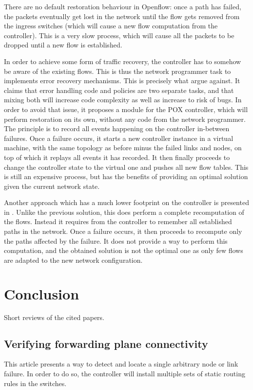 \documentclass[compsoc]{IEEEtran}
\begin{document}
There are no default restoration behaviour in Openflow: once a path has failed, the packets eventually get lost in the network until the flow gets removed from the ingress switches (which will cause a new flow computation from the controller). This is a very slow process, which will cause all the packets to be dropped until a new flow is established.

In order to achieve some form of traffic recovery, the controller has to somehow be aware of the existing flows. This is thus the network programmer task to implements error recovery mechanisms. This is precisely what \cite{Kuzniar:2013:AFR:2491185.2491218} argue against. It claims that error handling code and policies are two separate tasks, and that mixing both will increase code complexity as well as increase to risk of bugs. In order to avoid that issue, it proposes a module for the POX controller, which will perform restoration on its own, without any code from the network programmer. The principle is to record all events happening on the controller in-between failures. Once a failure occurs, it starts a new controller instance in a virtual machine, with the same topology as before minus the failed links and nodes, on top of which it replays all events it has recorded. It then finally proceeds to change the controller state to the virtual one and pushes all new flow tables. This is still an expensive process, but has the benefits of providing an optimal solution given the current network state.

Another approach which has a much lower footprint on the controller is presented in \cite{2911632}. Unlike the previous solution, this does perform a complete recomputation of the flows. Instead it requires from the controller to remember all established paths in the network. Once a failure occurs, it then proceeds to recompute only the paths affected by the failure. It does not provide a way to perform this computation, and the obtained solution is not the optimal one as only few flows are adapted to the new network configuration.

\section{Conclusion}



\nocite{*}


\appendix
Short reviews of the cited papers.
\subsection{Verifying forwarding plane connectivity \cite{2013arXiv1308.4465K}}
This article presents a way to detect and locate a single arbitrary node or link failure.
In order to do so, the controller will install multiple sets of static routing rules in the switches.
\end{document}
